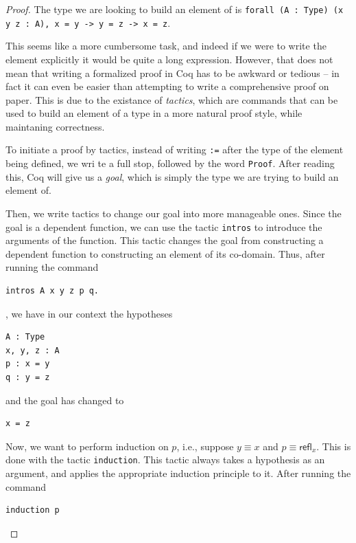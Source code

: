 \documentclass[12 pt]{amsart}
\theoremstyle{definition}
\theoremstyle{remark}
\newcommand{\refl}{\mathsf{refl}}
\begin{document}
\begin{proof}

The type we are looking to build an element of is \texttt{forall (A : Type) (x y z : A), x = y -> y = z -> x = z}. 

This seems like a more cumbersome task, and indeed if we were to write the element explicitly it would be quite a long expression. However, that does not mean that writing a formalized proof in Coq has to be awkward or tedious -- in fact it can even be easier than attempting to write a comprehensive proof on paper. This is due to the existance of \textit{tactics}, which are commands that can be used to build an element of a type in a more natural proof style, while maintaning correctness. 

To initiate a proof by tactics, instead of writing \texttt{:=} after the type of the element being defined, we wri te a full stop, followed by the word \texttt{Proof}. After reading this, Coq will give us a \textit{goal}, which is simply the type we are trying to build an element of. 

Then, we write tactics to change our goal into more manageable ones. Since the goal is a dependent function, we can use the tactic \texttt{intros} to introduce the arguments of the function. This tactic changes the goal from constructing a dependent function to constructing an element of its co-domain. Thus, after running the command

\begin{lstlisting}
intros A x y z p q.
\end{lstlisting}

, we have in our context the hypotheses

\begin{lstlisting}
A : Type
x, y, z : A
p : x = y
q : y = z
\end{lstlisting}

and the goal has changed to 

\begin{lstlisting}
x = z
\end{lstlisting}

Now, we want to perform induction on $p$, i.e., suppose $y\equiv x$ and $p\equiv \refl_x$. This is done with the tactic \texttt{induction}. This tactic always takes a hypothesis as an argument, and applies the appropriate induction principle to it. After running the command

\begin{lstlisting}
induction p
\end{lstlisting}


\end{proof}
\end{document}
